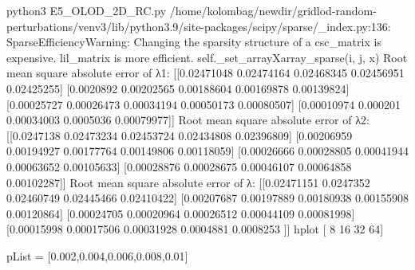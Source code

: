 python3 E5_OLOD_2D_RC.py 
/home/kolombag/newdir/gridlod-random-perturbations/venv3/lib/python3.9/site-packages/scipy/sparse/_index.py:136: SparseEfficiencyWarning: Changing the sparsity structure of a csc_matrix is expensive. lil_matrix is more efficient.
  self._set_arrayXarray_sparse(i, j, x)
Root mean square absolute error of λ1:
 [[0.02471048 0.02474164 0.02468345 0.02456951 0.02425255]
 [0.0020892  0.00202565 0.00188604 0.00169878 0.00139824]
 [0.00025727 0.00026473 0.00034194 0.00050173 0.00080507]
 [0.00010974 0.000201   0.00034003 0.0005036  0.00079977]]
Root mean square absolute error of λ2: 
 [[0.0247138  0.02473234 0.02453724 0.02434808 0.02396809]
 [0.00206959 0.00194927 0.00177764 0.00149806 0.00118059]
 [0.00026666 0.00028805 0.00041944 0.00063652 0.00105633]
 [0.00028876 0.00028675 0.00046107 0.00064858 0.00102287]]
Root mean square absolute error of λ: 
 [[0.02471151 0.0247352  0.02460749 0.02445466 0.02410422]
 [0.00207687 0.00197889 0.00180938 0.00155908 0.00120864]
 [0.00024705 0.00020964 0.00026512 0.00044109 0.00081998]
 [0.00015998 0.00017506 0.00031928 0.0004881  0.0008253 ]]
hplot [ 8 16 32 64]

pList = [0.002,0.004,0.006,0.008,0.01]